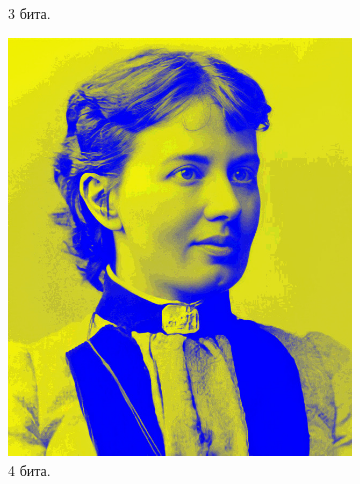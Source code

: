 \documentclass[11pt,a4paper,final]{article} %
\begin{document}
\begin{figure}[h!]
\begin{subfigure}[b]{0.3\linewidth}
		\caption{3 бита.}
		\label{fig:s3}
	\end{subfigure}
	
	\begin{subfigure}[b]{0.3\linewidth}
		\centering
		\includegraphics[width=\linewidth]{img/sofya2-4-5.jpg}
		\caption{4 бита.}
		\label{fig:s4}
	\end{subfigure}
	\hfill
	\begin{subfigure}[b]{0.3\linewidth}
		\centering

\end{subfigure}
\end{figure}
\end{document}
